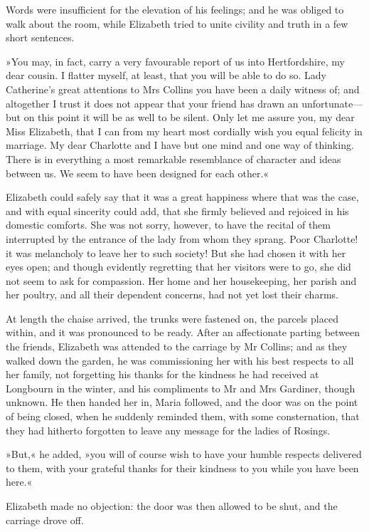 Words were insufficient for the elevation of his feelings; and he was obliged to walk about the room, while Elizabeth tried to unite civility and truth in a few short sentences.

»You may, in fact, carry a very favourable report of us into Hertfordshire, my dear cousin. I flatter myself, at least, that you will be able to do so. Lady Catherine's great attentions to Mrs Collins you have been a daily witness of; and altogether I trust it does not appear that your friend has drawn an unfortunate—but on this point it will be as well to be silent. Only let me assure you, my dear Miss Elizabeth, that I can from my heart most cordially wish you equal felicity in marriage. My dear Charlotte and I have but one mind and one way of thinking. There is in everything a most remarkable resemblance of character and ideas between us. We seem to have been designed for each other.«

Elizabeth could safely say that it was a great happiness where that was the case, and with equal sincerity could add, that she firmly believed and rejoiced in his domestic comforts. She was not sorry, however, to have the recital of them interrupted by the entrance of the lady from whom they sprang. Poor Charlotte! it was melancholy to leave her to such society! But she had chosen it with her eyes open; and though evidently regretting that her visitors were to go, she did not seem to ask for compassion. Her home and her housekeeping, her parish and her poultry, and all their dependent concerns, had not yet lost their charms.

At length the chaise arrived, the trunks were fastened on, the parcels placed within, and it was pronounced to be ready. After an affectionate parting between the friends, Elizabeth was attended to the carriage by Mr Collins; and as they walked down the garden, he was commissioning her with his best respects to all her family, not forgetting his thanks for the kindness he had received at Longbourn in the winter, and his compliments to Mr and Mrs Gardiner, though unknown. He then handed her in, Maria followed, and the door was on the point of being closed, when he suddenly reminded them, with some consternation, that they had hitherto forgotten to leave any message for the ladies of Rosings.

»But,« he added, »you will of course wish to have your humble respects delivered to them, with your grateful thanks for their kindness to you while you have been here.«

Elizabeth made no objection: the door was then allowed to be shut, and the carriage drove off.

